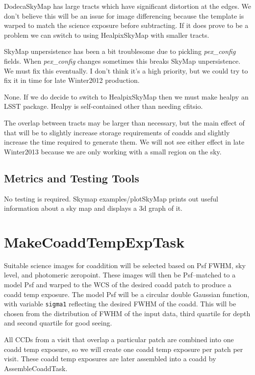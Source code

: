\documentclass[12pt]{article}
\begin{document}
DodecaSkyMap has large tracts which have significant distortion at the edges.
We don't believe this will be an issue for image differencing because the template is warped
to match the science exposure before subtracting. If it does prove to be a problem
we can switch to using HealpixSkyMap with smaller tracts.

SkyMap unpersistence has been a bit troublesome due to pickling {\it pex\_config} fields.
When {\it pex\_config} changes sometimes this breaks SkyMap unpersistence. We must fix this eventually.
I don't think it's a high priority, but we could try to fix it in time for late Winter2012 production.

None. If we do decide to switch to HealpixSkyMap then we must make healpy an LSST package.
Healpy is self-contained other than needing cfitsio.

The overlap between tracts may be larger than necessary, but the main effect of that
will be to slightly increase storage requirements of coadds and slightly increase
the time required to generate them. We will not see either effect in late Winter2013
because we are only working with a small region on the sky.

\subsection{Metrics and Testing Tools}

No testing is required.  Skymap examples/plotSkyMap prints out useful
information about a sky map and displays a 3d graph of it.


\clearpage 
\section{MakeCoaddTempExpTask} 

Suitable science images for coaddition will be selected based on Psf FWHM, 
sky level, and photomeric zeropoint.  These images will then be Psf--matched to a model Psf and warped
to the WCS of the desired coadd patch to produce a coadd temp exposure.
The model Psf will be a circular double Gaussian
function, with variable {\tt sigma1} reflecting the desired FWHM of the coadd.  This will
be chosen from the distribution of FWHM of the input data, third quartile for depth and second
quartile for good seeing.

All CCDs from a visit that overlap a particular patch are combined into one coadd temp exposure,
so we will create one coadd temp exposure per patch per visit.
These coadd temp exposures are later assembled into a coadd by AssembleCoaddTask.
\end{document}
